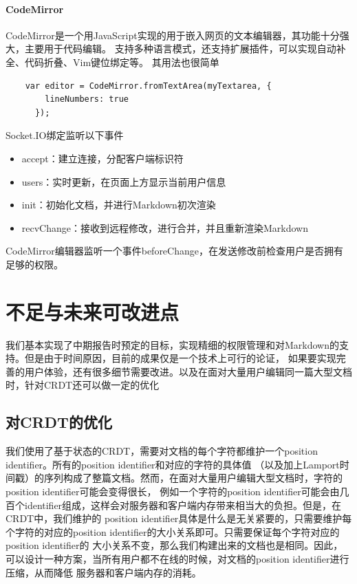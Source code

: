 \documentclass[11pt]{ctexart}
\begin{document}
\paragraph{CodeMirror}
CodeMirror是一个用JavaScript实现的用于嵌入网页的文本编辑器，其功能十分强大，主要用于代码编辑。
支持多种语言模式，还支持扩展插件，可以实现自动补全、代码折叠、Vim键位绑定等。
其用法也很简单
\begin{verbatim}
    var editor = CodeMirror.fromTextArea(myTextarea, {
        lineNumbers: true
      });
\end{verbatim}

Socket.IO绑定监听以下事件
\begin{itemize}
    \item \textsf{accept}：建立连接，分配客户端标识符
    \item \textsf{users}：实时更新，在页面上方显示当前用户信息
    \item \textsf{init}：初始化文档，并进行Markdown初次渲染
    \item \textsf{recvChange}：接收到远程修改，进行合并，并且重新渲染Markdown
\end{itemize}

CodeMirror编辑器监听一个事件\textsf{beforeChange}，在发送修改前检查用户是否拥有足够的权限。

\section{不足与未来可改进点}
我们基本实现了中期报告时预定的目标，实现精细的权限管理和对Markdown的支持。但是由于时间原因，目前的成果仅是一个技术上可行的论证，
如果要实现完善的用户体验，还有很多细节需要改进。以及在面对大量用户编辑同一篇大型文档时，针对CRDT还可以做一定的优化
\subsection{对CRDT的优化}
我们使用了基于状态的CRDT，需要对文档的每个字符都维护一个position identifier。所有的position identifier和对应的字符的具体值
（以及加上Lamport时间戳）的序列构成了整篇文档。然而，在面对大量用户编辑大型文档时，字符的position identifier可能会变得很长，
例如一个字符的position identifier可能会由几百个identifier组成，这样会对服务器和客户端内存带来相当大的负担。但是，在CRDT中，我们维护的
position identifier具体是什么是无关紧要的，只需要维护每个字符的对应的position identifier的大小关系即可。只需要保证每个字符对应的position identifier的
大小关系不变，那么我们构建出来的文档也是相同。因此，可以设计一种方案，当所有用户都不在线的时候，对文档的position identifier进行压缩，从而降低
服务器和客户端内存的消耗。
\end{document}
